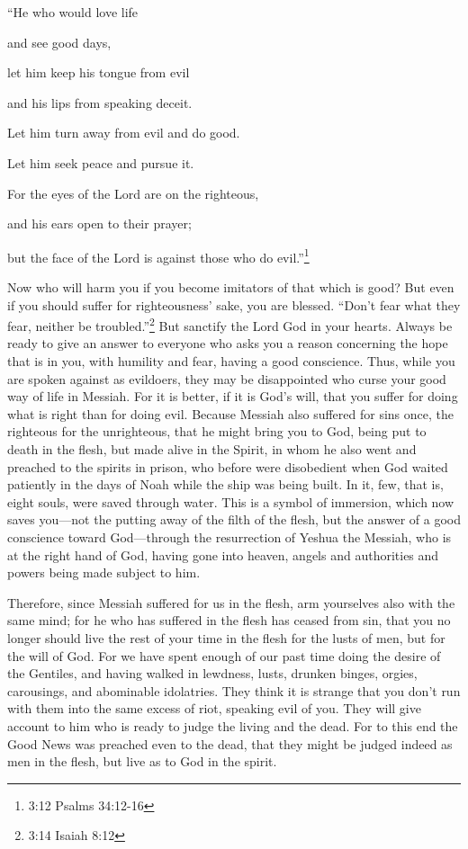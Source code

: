 “He who would love life

and see good days,

let him keep his tongue from evil

and his lips from speaking deceit.


\myverse{}Let him turn away from evil and do good.

Let him seek peace and pursue it.


\myverse{}For the eyes of the Lord are on the righteous,

and his ears open to their prayer;

but the face of the Lord is against those who do evil.”\footnote{3:12 Psalms 34:12-16}


\myverse{}Now who will harm you if you become imitators of that which is good? \myverse{}But even if you should suffer for righteousness’ sake, you are blessed. “Don’t fear what they fear, neither be troubled.”\footnote{3:14 Isaiah 8:12} \myverse{}But sanctify the Lord God in your hearts. Always be ready to give an answer to everyone who asks you a reason concerning the hope that is in you, with humility and fear, \myverse{}having a good conscience. Thus, while you are spoken against as evildoers, they may be disappointed who curse your good way of life in Messiah. \myverse{}For it is better, if it is God’s will, that you suffer for doing what is right than for doing evil. \myverse{}Because Messiah also suffered for sins once, the righteous for the unrighteous, that he might bring you to God, being put to death in the flesh, but made alive in the Spirit, \myverse{}in whom he also went and preached to the spirits in prison, \myverse{}who before were disobedient when God waited patiently in the days of Noah while the ship was being built. In it, few, that is, eight souls, were saved through water. \myverse{}This is a symbol of immersion, which now saves you—not the putting away of the filth of the flesh, but the answer of a good conscience toward God—through the resurrection of Yeshua the Messiah, \myverse{}who is at the right hand of God, having gone into heaven, angels and authorities and powers being made subject to him.


\mychapter{} \myverse*{}Therefore, since Messiah suffered for us in the flesh, arm yourselves also with the same mind; for he who has suffered in the flesh has ceased from sin, \myverse{}that you no longer should live the rest of your time in the flesh for the lusts of men, but for the will of God. \myverse{}For we have spent enough of our past time doing the desire of the Gentiles, and having walked in lewdness, lusts, drunken binges, orgies, carousings, and abominable idolatries. \myverse{}They think it is strange that you don’t run with them into the same excess of riot, speaking evil of you. \myverse{}They will give account to him who is ready to judge the living and the dead. \myverse{}For to this end the Good News was preached even to the dead, that they might be judged indeed as men in the flesh, but live as to God in the spirit.


